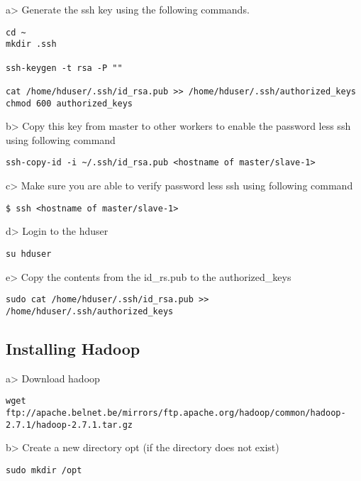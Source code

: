 a\textgreater{} Generate the ssh key using the following commands.

\begin{lstlisting}
cd ~
mkdir .ssh 

ssh-keygen -t rsa -P ""

cat /home/hduser/.ssh/id_rsa.pub >> /home/hduser/.ssh/authorized_keys
chmod 600 authorized_keys
\end{lstlisting}

b\textgreater{} Copy this key from master to other workers to enable the
password less ssh using following command

\begin{lstlisting}
ssh-copy-id -i ~/.ssh/id_rsa.pub <hostname of master/slave-1>
\end{lstlisting}

c\textgreater{} Make sure you are able to verify password less ssh using
following command

\begin{lstlisting}
$ ssh <hostname of master/slave-1>
\end{lstlisting}

d\textgreater{} Login to the hduser

\begin{lstlisting}
su hduser
\end{lstlisting}

e\textgreater{} Copy the contents from the id\_rs.pub to the
authorized\_keys

\begin{lstlisting}
sudo cat /home/hduser/.ssh/id_rsa.pub >> /home/hduser/.ssh/authorized_keys
\end{lstlisting}

\subsection{Installing Hadoop}

a\textgreater{} Download hadoop

\begin{lstlisting}
wget ftp://apache.belnet.be/mirrors/ftp.apache.org/hadoop/common/hadoop-2.7.1/hadoop-2.7.1.tar.gz 
\end{lstlisting}

b\textgreater{} Create a new directory opt (if the directory does not
exist)

\begin{lstlisting}
sudo mkdir /opt 
\end{lstlisting}

